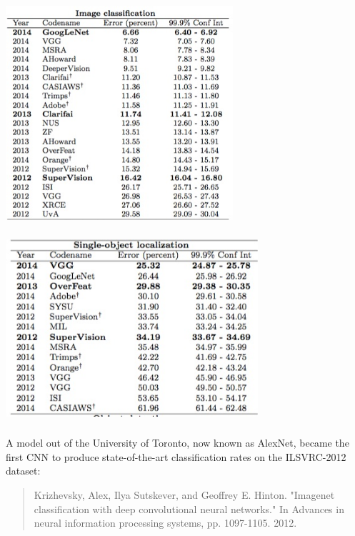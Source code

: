 \documentclass[xetex,mathserif,serif,aspectratio=169]{beamer}
\begin{document}
\begin{frame}[fragile] \frametitle{} \oldB \small

\begin{center}
\includegraphics[width=0.63\textwidth]{img/ilsvrcClassRates.jpg}
\end{center}

\end{frame}


\begin{frame}[fragile] \frametitle{} \oldB \small

\begin{center}
\includegraphics[width=0.7\textwidth]{img/ilsvrcLocalRates.jpg}
\end{center}

\end{frame}

\begin{frame}[fragile] \frametitle{} \oldB \small


A model out of the University of Toronto, now known as AlexNet,
became the first CNN to produce state-of-the-art classification
rates on the ILSVRC-2012 dataset:
\begin{quote}
Krizhevsky, Alex, Ilya Sutskever, and Geoffrey E. Hinton. "Imagenet classification with deep convolutional neural networks." In Advances in neural information processing systems, pp. 1097-1105. 2012.
\end{quote}

\end{frame}
\end{document}
